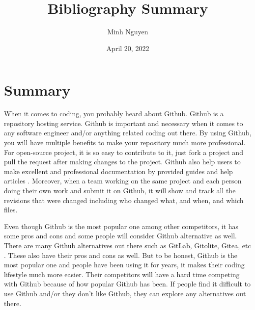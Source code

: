 \documentclass{article}
\title{Bibliography Summary}
\author{Minh Nguyen}
\date{April 20, 2022}
\begin{document}
\maketitle

\section*{Summary}
When it comes to coding, you probably heard about Github. Github is a repository hosting service. Github is important and necessary when it comes to any software engineer and/or anything related coding out there. By using Github, you will have multiple benefits to make your repository much more professional. For open-source project, it is so easy to contribute to it, just fork a project and pull the request after making changes to the project. Github also help users to make excellent and professional documentation by provided guides and help articles \cite{Ekaterina18}. Moreover, when a team working on the same project and each person doing their own work and submit it on Github, it will show and track all the revisions that were changed including who changed what, and when, and which files. \cite{Ekaterina18}

\medskip

Even though Github is the most popular one among other competitors, it has some pros and cons and some people will consider Github alternative as well. There are many Github alternatives out there such as GitLab, Gitolite, Gitea, etc \cite{Tom21}. These also have their pros and cons as well. But to be honest, Github is the most popular one and people have been using it for years, it makes their coding lifestyle much more easier. Their competitors will have a hard time competing with Github because of how popular Github has been. If people find it difficult to use Github and/or they don't like Github, they can explore any alternatives out there. \cite{Tom21}




\printbibliography
\end{document}
